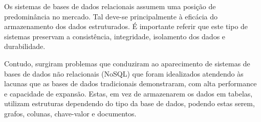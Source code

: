 Os sistemas de bases de dados relacionais assumem uma posição de predominância no mercado. Tal deve-se principalmente à eficácia do armazenamento dos dados estruturados. É importante referir que este tipo de sistemas preservam a consistência, integridade, isolamento dos dados e durabilidade. 
    
Contudo, surgiram problemas que conduziram ao aparecimento de sistemas de bases de dados não relacionais (NoSQL) que foram idealizados atendendo às lacunas que as bases de dados tradicionais demonstraram, com alta performance e capacidade de expansão. Estas, em vez de armazenarem os dados em tabelas, utilizam estruturas dependendo do tipo da base de dados, podendo estas serem, grafos, colunas, chave-valor e documentos.